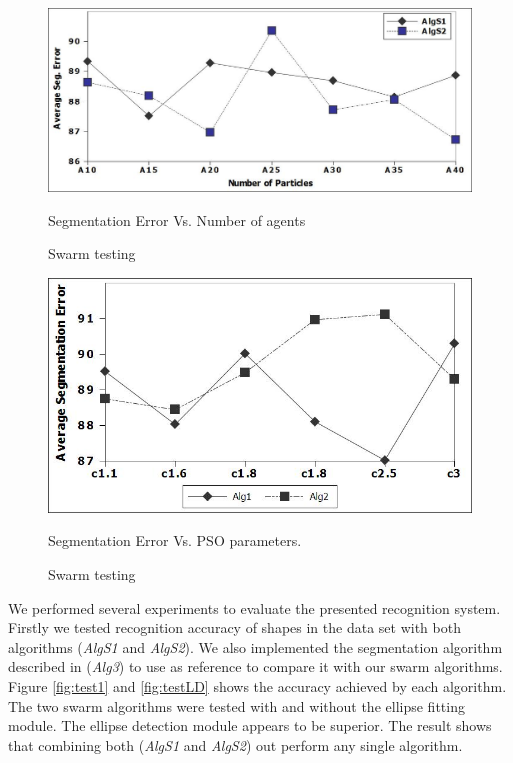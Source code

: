 \documentclass{article}
\begin{document}
 \begin{figure}
	\centering		
	 \includegraphics[scale=0.3]{images/swarmAgentTest.jpg}
	 	\caption{Swarm testing} Segmentation Error Vs. Number of agents
	 	\label{fig:swarmtesting}
\end{figure} 

\begin{figure}
	\centering		
	 \includegraphics[scale=0.4]{images/swarmParamterC.jpg}
	 	\caption{Swarm testing} Segmentation Error Vs. PSO parameters.
	 	\label{fig:swarmtesting2}
	
\end{figure} 

We performed several experiments to evaluate the presented recognition system. Firstly we tested recognition accuracy of shapes in the data set with both algorithms (\textsl{AlgS1} and \textsl{AlgS2}). We also implemented the segmentation algorithm described in \cite{earlyprocess} (\textsl{Alg3}) to use as reference to compare it with our swarm algorithms. Figure \ref{fig:test1} and \ref{fig:testLD} shows the accuracy achieved by each algorithm. The two swarm algorithms were tested with and without the ellipse fitting module. The ellipse detection module appears to be superior. The result shows that combining both  (\textsl{AlgS1} and \textsl{AlgS2}) out perform any single algorithm. %
\end{document}
